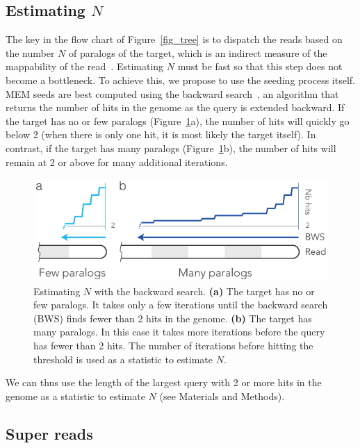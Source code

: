 \documentclass[english]{article}
\begin{document}
\subsection{Estimating $N$}
\label{sec_N}

The key in the flow chart of Figure~\ref{fig_tree} is to dispatch the
reads based on the number $N$ of paralogs of the target, which is an
indirect measure of the mappability of the read~\cite{pmid22276185}.
Estimating $N$ must be fast so that this step does not become a
bottleneck. To achieve this, we propose to use the seeding process itself.
MEM seeds are best computed using the backward
search~\cite{ferragina2000opportunistic}, an algorithm that returns the
number of hits in the genome as the query is extended backward. If the
target has no or few paralogs (Figure~\ref{fig_back}a), the number of hits
will quickly go below 2 (when there is only one hit, it is most likely the
target itself). In contrast, if the target has many paralogs
(Figure~\ref{fig_back}b), the number of hits will remain at 2 or above for
many additional iterations.

\begin{figure}[h]
\begin{center}
\includegraphics[scale=.84]{pushing_backward.pdf}
\end{center}
\caption{Estimating $N$ with the backward search. \textbf{(a)} The target
has no or few paralogs. It takes only a few iterations until the backward
search (BWS) finds fewer than 2 hits in the genome. \textbf{(b)} The
target has many paralogs. In this case it takes more iterations before the
query has fewer than 2 hits. The number of iterations before hitting the
threshold is used as a statistic to estimate $N$.}
\label{fig_back}
\end{figure}

We can thus use the length of the largest query with 2 or more hits in the
genome as a statistic to estimate $N$ (see Materials and Methods).


\subsection{Super reads}
\label{sec_super}
\end{document}
